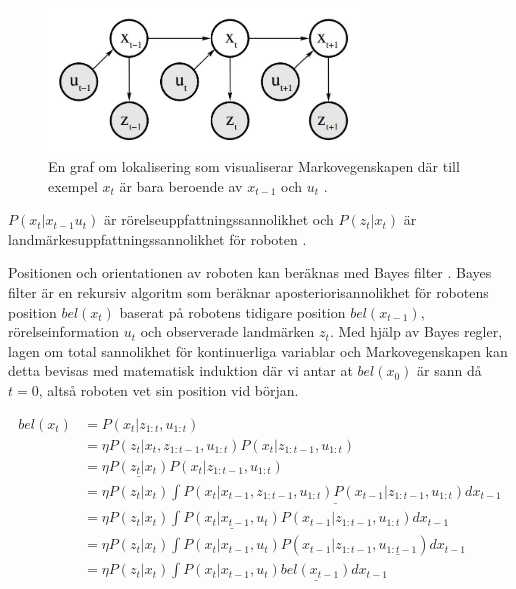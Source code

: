 \begin{figure}[ht]
    \begin{center}
    \includegraphics[width=0.75\textwidth]{markov.JPG}
    \caption{En graf om lokalisering som visualiserar Markovegenskapen där till exempel $x_t$ är bara beroende av $x_{t-1}$ och $u_t$ \citep{ProbabilisticRobotics}.}
    \label{markov}
    \end{center}
\end{figure}

$P(x_t|x_{t-1} u_{t})$ är rörelseuppfattningssannolikhet och $P(z_t|x_t)$ är landmärkesuppfattningssannolikhet för roboten \citep{ProbabilisticRobotics}. 

Positionen och orientationen av roboten kan beräknas med Bayes filter \citep{ProbabilisticRobotics}. Bayes filter är en rekursiv algoritm som beräknar aposteriorisannolikhet för robotens position $bel(x_t)$ baserat på robotens tidigare position $bel(x_{t-1})$, rörelseinformation $u_t$ och observerade landmärken $z_t$. Med hjälp av Bayes regler, lagen om total sannolikhet för kontinuerliga variablar och Markovegenskapen kan detta bevisas med matematisk induktion där vi antar at $bel(x_0)$ är sann då $t = 0$, altså roboten vet sin position vid början.

\begin{align}
bel(x_t) & = P(x_t | z_{1:t}, u_{1:t}) \tag{BF1}\label{BF1} \\
        & = \eta P(z_t | x_t, z_{1:t-1}, u_{1:t}) P(x_t | z_{1:t-1}, u_{1:t}) \tag{BF2}\label{BF2}\\
        & = \eta \underline{P(z_t | x_t)} P(x_t | z_{1:t-1}, u_{1:t}) \tag{BF3}\label{BF3}\\
        & = \eta P(z_t | x_t) \underline{\int P(x_t | x_{t-1}, z_{1:t-1}, u_{1:t}) P(x_{t-1} | z_{1:t-1}, u_{1:t}) dx_{t-1}} \tag{BF4}\label{BF4}\\
        & = \eta P(z_t | x_t) \int \underline{P(x_t | x_{t-1}, u_t)} P(x_{t-1} | z_{1:t-1}, u_{1:t}) dx_{t-1} \tag{BF5}\label{BF5}\\
        & = \eta P(z_t | x_t) \int P(x_t | x_{t-1}, u_t) P(x_{t-1} | z_{1:t-1}, \underline{u_{1:t-1}}) dx_{t-1} \tag{BF6}\label{BF6}\\
        & = \eta P(z_t | x_t) \int P(x_t | x_{t-1}, u_t) \underline{bel(x_{t-1})} dx_{t-1} \tag{BF7}\label{BF7}
\end{align}

